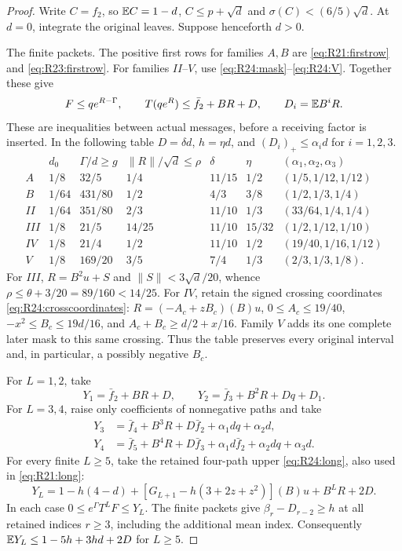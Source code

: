 \begin{proof}
Write \(C=f_2\), so \(\mathbb E C=1-d\),
\(C\le p+\sqrt d\) and \(\sigma(C)<(6/5)\sqrt d\).
At \(d=0\), integrate the original leaves. Suppose henceforth \(d>0\).

The finite packets. The positive first rows for families \(A,B\)
are \eqref{eq:R21:firstrow} and \eqref{eq:R23:firstrow}.
For families \(II\)--\(V\), use
\eqref{eq:R24:mask}--\allowbreak\eqref{eq:R24:V}.
Together these give
\[
 F\le qe^{R-\Gamma},\qquad
 T(qe^R)\le\bar f_2+BR+D,\qquad D_i=\mathbb E B^iR.
\]
These are inequalities between actual messages, before a receiving
factor is inserted. In the following table \(D=\delta d\),
\(h=\eta d\), and \((D_i)_+\le\alpha_i d\) for \(i=1,2,3\).
\[
\begin{array}{c|c|c|c|c|c|c}
 &d_0&\Gamma/d\ge g&\|R\|/\sqrt d\le\rho&\delta&\eta
 &(\alpha_1,\alpha_2,\alpha_3)\\\hline
A&1/8&32/5&1/4&11/15&1/2&(1/5,1/12,1/12)\\
B&1/64&431/80&1/2&4/3&3/8&(1/2,1/3,1/4)\\
II&1/64&351/80&2/3&11/10&1/3&(33/64,1/4,1/4)\\
III&1/8&21/5&14/25&11/10&15/32&(1/2,1/12,1/10)\\
IV&1/8&21/4&1/2&11/10&1/2&(19/40,1/16,1/12)\\
V&1/8&169/20&3/5&7/4&1/3&(2/3,1/3,1/8).
\end{array}
\]
For \(III\), \(R=B^2u+S\) and
\(\|S\|<3\sqrt d/20\), whence
\(\rho\le\theta+3/20=89/160<14/25\).
For \(IV\), retain the signed crossing coordinates
\eqref{eq:R24:crosscoordinates}: \(R=(-A_c+zB_c)(B)u\),
\(0\le A_c\le19/40\), \(-x^2\le B_c\le19d/16\), and
\(A_c+B_c\ge d/2+x/16\). Family \(V\) adds its one complete
later mask to this same crossing. Thus the table preserves every
original interval and, in particular, a possibly negative \(B_c\).

For \(L=1,2\), take
\[
 Y_1=\bar f_2+BR+D,\qquad
 Y_2=\bar f_3+B^2R+Dq+D_1.
\]
For \(L=3,4\), raise only coefficients of nonnegative paths and take
\[
\begin{aligned}
 Y_3&=\bar f_4+B^3R+D\bar f_2+\alpha_1dq+\alpha_2d,\\
 Y_4&=\bar f_5+B^4R+D\bar f_3
              +\alpha_1d\bar f_2+\alpha_2dq+\alpha_3d.
\end{aligned}
\]
For every finite \(L\ge5\), take the retained four-path upper
\eqref{eq:R24:long}, also used in \eqref{eq:R21:long}:
\[
 Y_L=1-h(4-d)+[G_{L+1}-h(3+2z+z^2)](B)u+B^LR+2D.
\]
In each case \(0\le e^\Gamma T^LF\le Y_L\).
The finite packets give \(\beta_r-D_{r-2}\ge h\) at all retained
indices \(r\ge3\), including the additional mean index. Consequently
\(\mathbb E Y_L\le1-5h+3hd+2D\) for \(L\ge5\).


\end{proof}
